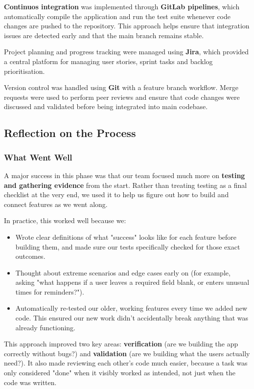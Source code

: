 \documentclass[a4paper,12pt]{article}
\begin{document}
\textbf{Continuos integration} was implemented through \textbf{GitLab pipelines}, which automatically compile the application and run the test suite whenever code changes are pushed to the repository. This approach helps ensure that integration issues are detected early and that the main branch remains stable.

Project planning and progress tracking were managed using \textbf{Jira}, which provided a central platform for managing user stories, sprint tasks and backlog prioritisation.

Version control was handled using \textbf{Git} with a feature branch workflow. Merge requests were used to perform peer reviews and ensure that code changes were discussed and validated before being integrated into main codebase.



\subsection{Reflection on the Process}

\subsubsection{What Went Well}

A major success in this phase was that our team focused much more on \textbf{testing and gathering evidence} from the start. Rather than treating testing as a final checklist at the very end, we used it to help us figure out how to build and connect features as we went along.

In practice, this worked well because we:
\begin{itemize}
    \item Wrote clear definitions of what "success" looks like for each feature before building them, and made sure our tests specifically checked for those exact outcomes.
    \item Thought about extreme scenarios and edge cases early on (for example, asking "what happens if a user leaves a required field blank, or enters unusual times for reminders?").
    \item Automatically re-tested our older, working features every time we added new code. This ensured our new work didn't accidentally break anything that was already functioning.
\end{itemize}

This approach improved two key areas: \textbf{verification} (are we building the app correctly without bugs?) and \textbf{validation} (are we building what the users actually need?). It also made reviewing each other's code much easier, because a task was only considered "done" when it visibly worked as intended, not just when the code was written.
\end{document}
